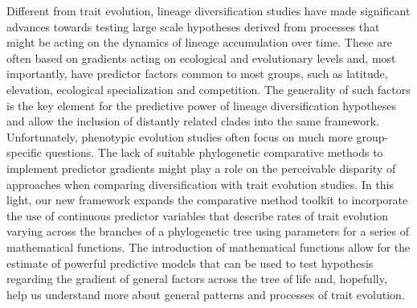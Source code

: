 Different from trait evolution, lineage diversification studies have made significant advances towards testing large scale hypotheses derived from processes that might be acting on the dynamics of lineage accumulation over time. These are often based on gradients acting on ecological and evolutionary levels and, most importantly, have predictor factors common to most groups, such as latitude, elevation, ecological specialization and competition. The generality of such factors is the key element for the predictive power of lineage diversification hypotheses and allow the inclusion of distantly related clades into the same framework. Unfortunately, phenotypic evolution studies often focus on much more group-specific questions. The lack of suitable phylogenetic comparative methods to implement predictor gradients might play a role on the perceivable disparity of approaches when comparing diversification with trait evolution studies. In this light, our new framework expands the comparative method toolkit to incorporate the use of continuous predictor variables that describe rates of trait evolution varying across the branches of a phylogenetic tree using parameters for a series of mathematical functions. The introduction of mathematical functions allow for the estimate of powerful predictive models that can be used to test hypothesis regarding the gradient of general factors across the tree of life and, hopefully, help us understand more about general patterns and processes of trait evolution.



\pagebreak


